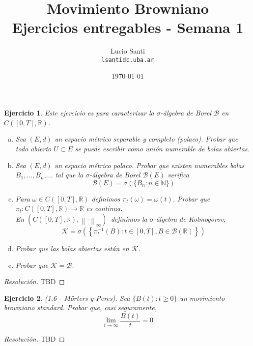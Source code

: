 \documentclass[a4paper,11pt]{article}
\title{Movimiento Browniano\\
      \small{Ejercicios entregables - Semana 1}}
\author{Lucio Santi\\
        \texttt{lsanti\at dc.uba.ar}}
\date{\today}
\newcommand{\norm}[1]{\left\lVert#1\right\rVert}
\newcommand{\CT}{\ensuremath{C([0,T], \mathbb{R})}}
\newcommand{\CTesp}{\ensuremath{(C([0,T], \mathbb{R}), \norm{\cdot}_{\infty})}}
\newcommand{\Bor}[1]{\ensuremath{\mathcal{B}(#1)}}
\newtheorem*{ej}{Ejercicio}
\begin{document}
\maketitle

\begin{ej} 
    Este ejercicio es para caracterizar la $\sigma$-álgebra de Borel
    $\mathcal{B}$ en \CT.

    \begin{enumerate}[a)]
        \item Sea $(E,d)$ un espacio métrico separable y completo (polaco).
        Probar que todo abierto $U \subset E$ se puede escribir como unión
        numerable de bolas abiertas.
        
        \item Sea $(E,d)$ un espacio métrico polaco. Probar que existen 
        numerables bolas $B_1, \dots, B_n, \dots$ tal que la $\sigma$-álgebra
        de Borel \Bor{E} verifica
        $$\Bor{E} = \sigma\left(\{B_n : n \in \mathbb{N} \}\right)$$

        \item Para $\omega \in \CT$ definimos $\pi_t(\omega) = \omega(t)$.
        Probar que $\pi_t : \CT \rightarrow \mathbb{R}$ es continua.\\

        En \CTesp \, definimos la $\sigma$-álgebra de Kolmogorov,
        $$\mathcal{K} = \sigma\left(\left\{\pi_{t}^{-1}(B) : t \in [0,T],
        B \in \Bor{\mathbb{R}} \right\}\right)$$

        \item Probar que las bolas abiertas están en $\mathcal{K}$.

        \item Probar que $\mathcal{K} = \mathcal{B}$.
    \end{enumerate}

\end{ej}

\begin{proof}[Resoluci\'on]
TBD
\end{proof}


\begin{ej}
    (1.6 - Mörters y Peres). Sea $\{B(t) : t \geq 0\}$ un movimiento browniano
    standard. Probar que, casi seguramente,
    $$\lim_{t \to \infty}{\frac{B(t)}{t}} = 0$$ 
\end{ej}

\begin{proof}[Resoluci\'on]
TBD
\end{proof}
\end{document}
